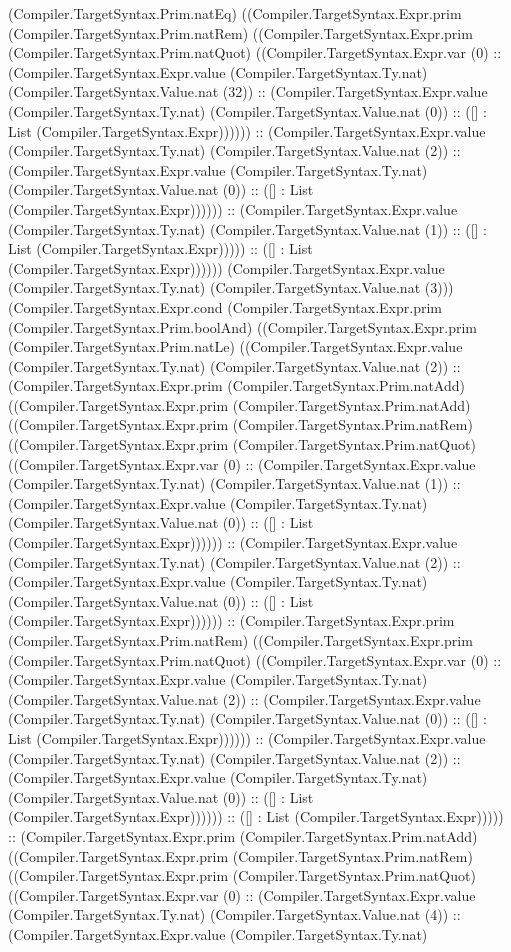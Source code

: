 \documentclass[11pt]{article}
\begin{document}
(Compiler.TargetSyntax.Prim.natEq) ((Compiler.TargetSyntax.Expr.prim (Compiler.TargetSyntax.Prim.natRem) ((Compiler.TargetSyntax.Expr.prim (Compiler.TargetSyntax.Prim.natQuot) ((Compiler.TargetSyntax.Expr.var (0) :: (Compiler.TargetSyntax.Expr.value (Compiler.TargetSyntax.Ty.nat) (Compiler.TargetSyntax.Value.nat (32)) :: (Compiler.TargetSyntax.Expr.value (Compiler.TargetSyntax.Ty.nat) (Compiler.TargetSyntax.Value.nat (0)) :: ([] : List (Compiler.TargetSyntax.Expr)))))) :: (Compiler.TargetSyntax.Expr.value (Compiler.TargetSyntax.Ty.nat) (Compiler.TargetSyntax.Value.nat (2)) :: (Compiler.TargetSyntax.Expr.value (Compiler.TargetSyntax.Ty.nat) (Compiler.TargetSyntax.Value.nat (0)) :: ([] : List (Compiler.TargetSyntax.Expr)))))) :: (Compiler.TargetSyntax.Expr.value (Compiler.TargetSyntax.Ty.nat) (Compiler.TargetSyntax.Value.nat (1)) :: ([] : List (Compiler.TargetSyntax.Expr))))) :: ([] : List (Compiler.TargetSyntax.Expr)))))) (Compiler.TargetSyntax.Expr.value (Compiler.TargetSyntax.Ty.nat) (Compiler.TargetSyntax.Value.nat (3))) (Compiler.TargetSyntax.Expr.cond (Compiler.TargetSyntax.Expr.prim (Compiler.TargetSyntax.Prim.boolAnd) ((Compiler.TargetSyntax.Expr.prim (Compiler.TargetSyntax.Prim.natLe) ((Compiler.TargetSyntax.Expr.value (Compiler.TargetSyntax.Ty.nat) (Compiler.TargetSyntax.Value.nat (2)) :: (Compiler.TargetSyntax.Expr.prim (Compiler.TargetSyntax.Prim.natAdd) ((Compiler.TargetSyntax.Expr.prim (Compiler.TargetSyntax.Prim.natAdd) ((Compiler.TargetSyntax.Expr.prim (Compiler.TargetSyntax.Prim.natRem) ((Compiler.TargetSyntax.Expr.prim (Compiler.TargetSyntax.Prim.natQuot) ((Compiler.TargetSyntax.Expr.var (0) :: (Compiler.TargetSyntax.Expr.value (Compiler.TargetSyntax.Ty.nat) (Compiler.TargetSyntax.Value.nat (1)) :: (Compiler.TargetSyntax.Expr.value (Compiler.TargetSyntax.Ty.nat) (Compiler.TargetSyntax.Value.nat (0)) :: ([] : List (Compiler.TargetSyntax.Expr)))))) :: (Compiler.TargetSyntax.Expr.value (Compiler.TargetSyntax.Ty.nat) (Compiler.TargetSyntax.Value.nat (2)) :: (Compiler.TargetSyntax.Expr.value (Compiler.TargetSyntax.Ty.nat) (Compiler.TargetSyntax.Value.nat (0)) :: ([] : List (Compiler.TargetSyntax.Expr)))))) :: (Compiler.TargetSyntax.Expr.prim (Compiler.TargetSyntax.Prim.natRem) ((Compiler.TargetSyntax.Expr.prim (Compiler.TargetSyntax.Prim.natQuot) ((Compiler.TargetSyntax.Expr.var (0) :: (Compiler.TargetSyntax.Expr.value (Compiler.TargetSyntax.Ty.nat) (Compiler.TargetSyntax.Value.nat (2)) :: (Compiler.TargetSyntax.Expr.value (Compiler.TargetSyntax.Ty.nat) (Compiler.TargetSyntax.Value.nat (0)) :: ([] : List (Compiler.TargetSyntax.Expr)))))) :: (Compiler.TargetSyntax.Expr.value (Compiler.TargetSyntax.Ty.nat) (Compiler.TargetSyntax.Value.nat (2)) :: (Compiler.TargetSyntax.Expr.value (Compiler.TargetSyntax.Ty.nat) (Compiler.TargetSyntax.Value.nat (0)) :: ([] : List (Compiler.TargetSyntax.Expr)))))) :: ([] : List (Compiler.TargetSyntax.Expr))))) :: (Compiler.TargetSyntax.Expr.prim (Compiler.TargetSyntax.Prim.natAdd) ((Compiler.TargetSyntax.Expr.prim (Compiler.TargetSyntax.Prim.natRem) ((Compiler.TargetSyntax.Expr.prim (Compiler.TargetSyntax.Prim.natQuot) ((Compiler.TargetSyntax.Expr.var (0) :: (Compiler.TargetSyntax.Expr.value (Compiler.TargetSyntax.Ty.nat) (Compiler.TargetSyntax.Value.nat (4)) :: (Compiler.TargetSyntax.Expr.value (Compiler.TargetSyntax.Ty.nat) 
\end{document}
